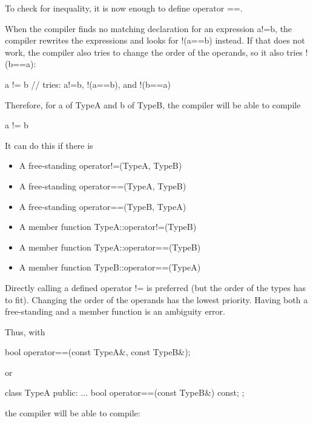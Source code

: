 To check for inequality, it is now enough to define operator ==.

When the compiler finds no matching declaration for an expression a!=b, the compiler rewrites the expressions and looks for !(a==b) instead. If that does not work, the compiler also tries to change the order of the operands, so it also tries !(b==a):

\begin{cpp}
a != b // tries: a!=b, !(a==b), and !(b==a)
\end{cpp}

Therefore, for a of TypeA and b of TypeB, the compiler will be able to compile

\begin{cpp}
a != b
\end{cpp}

It can do this if there is

\begin{itemize}
\item
A free-standing operator!=(TypeA, TypeB)

\item
A free-standing operator==(TypeA, TypeB)

\item
A free-standing operator==(TypeB, TypeA)

\item
A member function TypeA::operator!=(TypeB)

\item
A member function TypeA::operator==(TypeB)

\item
A member function TypeB::operator==(TypeA)
\end{itemize}

Directly calling a defined operator != is preferred (but the order of the types has to fit). Changing the order of the operands has the lowest priority. Having both a free-standing and a member function is an ambiguity error.

Thus, with

\begin{cpp}
bool operator==(const TypeA&, const TypeB&);
\end{cpp}

or

\begin{cpp}
class TypeA {
public:
	...
	bool operator==(const TypeB&) const;
};
\end{cpp}

the compiler will be able to compile:

